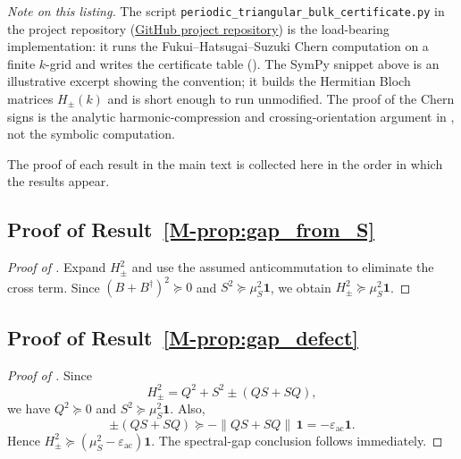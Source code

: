\documentclass[11pt]{article}
\numberwithin{equation}{section}
\theoremstyle{definition}
\theoremstyle{remark}
\newcommand{\Id}{\mathbf{1}}
\newcommand{\opnorm}[1]{\left\lVert#1\right\rVert}
\newcommand{\e}{\varepsilon}
\begin{document}
\noindent\emph{Note on this listing.} The script
\texttt{periodic\_triangular\_bulk\_certificate.py} in the project repository
(\href{https://github.com/yspennstate/Doubling-and-Jamming-A-Universal-Chern-Hamiltonian-on-Triangulated-Surfaces-with-Boundary}{GitHub project repository}) is the load-bearing implementation: it runs the
Fukui--Hatsugai--Suzuki Chern computation on a finite \(k\)-grid and writes the certificate
table (). The SymPy snippet above is an
illustrative excerpt showing the convention; it builds the Hermitian Bloch matrices
\(H_\pm(k)\) and is short enough to run unmodified.
The proof of the Chern signs is the analytic harmonic-compression and
crossing-orientation argument in , not the
symbolic computation.

The proof of each result in the main text is collected here in the order in which the results appear.

\subsection{Proof of Result~\ref{M-prop:gap_from_S}}\label{app:proof:prop:gap_from_S}
\begin{proof}[Proof of ]
Expand $H_\pm^2$ and use the assumed anticommutation to eliminate the cross term. Since $(B+B^\dagger)^2\succeq0$ and $S^2\succeq \mu_S^2\Id$, we obtain $H_\pm^2\succeq \mu_S^2\Id$.
\end{proof}

\subsection{Proof of Result~\ref{M-prop:gap_defect}}\label{app:proof:prop:gap_defect}
\begin{proof}[Proof of ]
Since
\[
H_\pm^2=Q^2+S^2\pm(QS+SQ),
\]
we have $Q^2\succeq0$ and $S^2\succeq \mu_S^2\Id$. Also,
\[
\pm(QS+SQ)\succeq -\opnorm{QS+SQ}\,\Id=-\e_{\mathrm{ac}}\Id.
\]
Hence $H_\pm^2\succeq (\mu_S^2-\e_{\mathrm{ac}})\Id$. The spectral-gap conclusion follows immediately.
\end{proof}
\end{document}

